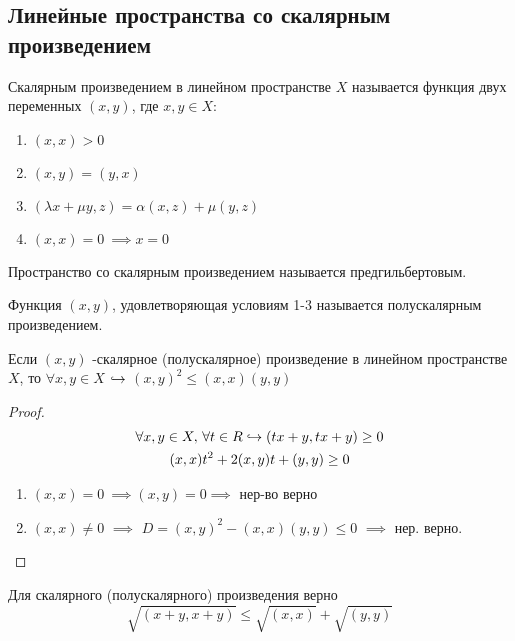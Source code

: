 \documentclass{article}
\begin{document}
\subsection{Линейные пространства со скалярным произведением}
\begin{definition}
  Скалярным произведением в линейном пространстве $X$ называется функция двух переменных
  $(x,y)$, где $x,y \in X$:
  \begin{enumerate}
    \item $(x,x)>0$
    \item $(x,y)=(y,x)$
    \item $(\lambda x+ \mu y, z) = \alpha(x,z) + \mu(y,z)$
    \item $(x,x)=0 \ \implies x = 0$
  \end{enumerate}
\end{definition}
\begin{definition}
  Пространство со скалярным произведением называется предгильбертовым.
\end{definition}
\begin{definition}
  Функция $(x,y)$, удовлетворяющая условиям 1-3 называется полускалярным произведением.
\end{definition}
\begin{theorem}
  \phantom{.}

  Если $(x,y)$ -скалярное (полускалярное) произведение в линейном пространстве $X$,
  то $\forall x,y\in X$ $\hookrightarrow$ $(x,y)^{2}\le (x,x)(y,y)$
\end{theorem}
\begin{proof}
  \begin{gather*}
    \forall x,y \in X, \, \forall t \in R \hookrightarrow (tx+y,tx+y)\ge 0 \\ 
    (x,x)t^{2}+2(x,y)t+(y,y) \ge 0 \\ 
  \end{gather*}
  \begin{enumerate}
    \item $(x,x) = 0 \ \implies (x,y)=0 \implies$ нер-во верно
    \item $(x,x)\neq 0$ $\implies$ $D=(x,y)^{2}-(x,x)(y,y)\le 0$ $\implies$ нер. верно.
  \end{enumerate}
\end{proof}
\begin{corollary}
  Для скалярного (полускалярного) произведения верно
  \[
    \sqrt{(x+y,x+y)} \le \sqrt{(x,x)}+\sqrt{(y,y)}
  \]
\end{corollary}
\end{document}
